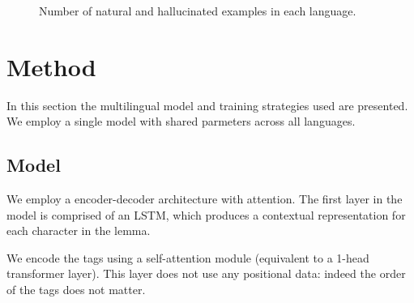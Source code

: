\documentclass[11pt,a4paper]{article}
\begin{document}
\begin{figure}[ht]
\caption{\label{fig:data} Number of natural and hallucinated examples in each language.}
\end{figure}




\section{Method}

In this section the multilingual model and training strategies used
are presented. We employ a single model with shared parmeters
across all languages. 

\subsection{Model}

We employ a encoder-decoder architecture with attention. The first
layer in the model is comprised of an LSTM, which produces a
contextual representation for each character in the lemma.

We encode the tags using a self-attention module (equivalent to a
1-head transformer layer).  This layer does not use any positional
data: indeed the order of the tags does not matter.
\end{document}
